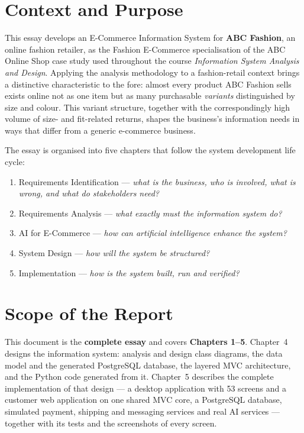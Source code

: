 \documentclass[11pt,a4paper,oneside]{extreport}
\begin{document}
\section*{Context and Purpose}
This essay develops an E-Commerce Information System for \textbf{ABC Fashion}, an online fashion retailer, as the Fashion E-Commerce specialisation of the ABC Online Shop case study used throughout the course \emph{Information System Analysis and Design}. Applying the analysis methodology to a fashion-retail context brings a distinctive characteristic to the fore: almost every product ABC Fashion sells exists online not as one item but as many purchasable \emph{variants} distinguished by size and colour. This variant structure, together with the correspondingly high volume of size- and fit-related returns, shapes the business's information needs in ways that differ from a generic e-commerce business.

The essay is organised into five chapters that follow the system development life cycle:
\begin{enumerate}[label=\textbf{Chapter \arabic*:},leftmargin=2.3cm]
  \item Requirements Identification --- \emph{what is the business, who is involved, what is wrong, and what do stakeholders need?}
  \item Requirements Analysis --- \emph{what exactly must the information system do?}
  \item AI for E-Commerce --- \emph{how can artificial intelligence enhance the system?}
  \item System Design --- \emph{how will the system be structured?}
  \item Implementation --- \emph{how is the system built, run and verified?}
\end{enumerate}

\section*{Scope of the Report}
This document is the \textbf{complete essay} and covers \textbf{Chapters 1--5}. Chapter~4 designs the information system: analysis and design class diagrams, the data model and the generated PostgreSQL database, the layered MVC architecture, and the Python code generated from it. Chapter~5 describes the complete implementation of that design --- a desktop application with 53 screens and a customer web application on one shared MVC core, a PostgreSQL database, simulated payment, shipping and messaging services and real AI services --- together with its tests and the screenshots of every screen.
\end{document}
